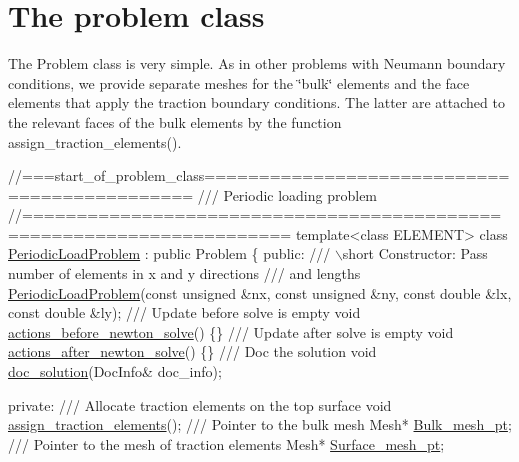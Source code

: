  

\hypertarget{index_problem}{}\section{The problem class}\label{index_problem}
The {\ttfamily Problem} class is very simple. As in other problems with Neumann boundary conditions, we provide separate meshes for the \char`\"{}bulk\char`\"{} elements and the face elements that apply the traction boundary conditions. The latter are attached to the relevant faces of the bulk elements by the function {\ttfamily assign\+\_\+traction\+\_\+elements()}.

 
\begin{DoxyCodeInclude}
\textcolor{comment}{//===start\_of\_problem\_class=============================================}
\textcolor{comment}{/// Periodic loading problem}
\textcolor{comment}{}\textcolor{comment}{//======================================================================}
\textcolor{keyword}{template}<\textcolor{keyword}{class} ELEMENT>
\textcolor{keyword}{class }\hyperlink{classPeriodicLoadProblem}{PeriodicLoadProblem} : \textcolor{keyword}{public} Problem
\{
\textcolor{keyword}{public}:
\textcolor{comment}{}
\textcolor{comment}{ /// \(\backslash\)short Constructor: Pass number of elements in x and y directions }
\textcolor{comment}{ /// and lengths}
\textcolor{comment}{} \hyperlink{classPeriodicLoadProblem_a66bf36608f2068374c09c73d9256edda}{PeriodicLoadProblem}(\textcolor{keyword}{const} \textcolor{keywordtype}{unsigned} &nx, \textcolor{keyword}{const} \textcolor{keywordtype}{unsigned} &ny, 
                     \textcolor{keyword}{const} \textcolor{keywordtype}{double} &lx, \textcolor{keyword}{const} \textcolor{keywordtype}{double} &ly);
\textcolor{comment}{}
\textcolor{comment}{ /// Update before solve is empty}
\textcolor{comment}{} \textcolor{keywordtype}{void} \hyperlink{classPeriodicLoadProblem_aad83601d810e4cc135f83c1308a0449b}{actions\_before\_newton\_solve}() \{\}
\textcolor{comment}{}
\textcolor{comment}{ /// Update after solve is empty}
\textcolor{comment}{} \textcolor{keywordtype}{void} \hyperlink{classPeriodicLoadProblem_aad99d153549e1ec0b5504e486039ef5e}{actions\_after\_newton\_solve}() \{\}
\textcolor{comment}{}
\textcolor{comment}{ /// Doc the solution}
\textcolor{comment}{} \textcolor{keywordtype}{void} \hyperlink{classPeriodicLoadProblem_ad414cf9a0b4a61de439e459f10e762c7}{doc\_solution}(DocInfo& doc\_info);

\textcolor{keyword}{private}:
\textcolor{comment}{}
\textcolor{comment}{ /// Allocate traction elements on the top surface}
\textcolor{comment}{} \textcolor{keywordtype}{void} \hyperlink{classPeriodicLoadProblem_ad850863c61c0055e230e6319d67905e2}{assign\_traction\_elements}();
 \textcolor{comment}{}
\textcolor{comment}{ /// Pointer to the bulk mesh}
\textcolor{comment}{} Mesh* \hyperlink{classPeriodicLoadProblem_a120027bff23e2cd1f17f560c852533b6}{Bulk\_mesh\_pt};
\textcolor{comment}{}
\textcolor{comment}{ /// Pointer to the mesh of traction elements}
\textcolor{comment}{} Mesh* \hyperlink{classPeriodicLoadProblem_a39b0b15487ae9aafc3d9e70b0e017325}{Surface\_mesh\_pt};


\end{DoxyCodeInclude}
